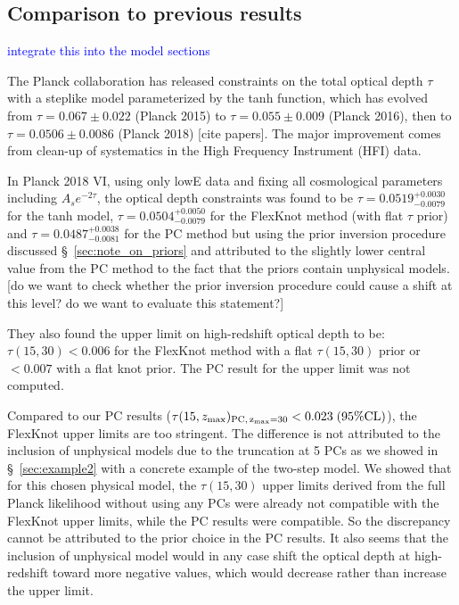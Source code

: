 \documentclass[prd,twocolumn,amsmath,amssymb,floatfix,superscriptaddress,nofootinbib]{revtex4-1}
\newcommand{\zmax}{z_{\rm max}}
\newcommand{\wh}[1]{\textcolor{blue}{#1}}
\begin{document}
{

\appendix



\subsection{Comparison to previous results}
\wh{integrate this into the model sections}

The Planck collaboration has released constraints on the total optical depth $\tau$ with a steplike model parameterized by the tanh function, which has evolved from $\tau = 0.067 \pm 0.022$ (Planck 2015) to $\tau = 0.055 \pm 0.009$ (Planck 2016), then to $\tau = 0.0506 \pm 0.0086$ (Planck 2018) [cite papers]. The major improvement comes from clean-up of systematics in the High Frequency Instrument (HFI) data. 

In Planck 2018 VI, using only lowE data and fixing all cosmological parameters including $A_s e^{-2\tau}$, the optical depth constraints was found to be $\tau = 0.0519^{+0.0030}_{-0.0079}$ for the tanh model, 
$\tau = 0.0504^{+0.0050}_{-0.0079}$ 
for the FlexKnot method (with flat $\tau$ prior) and 
$\tau = 0.0487^{+0.0038}_{-0.0081}$
for the PC method but using the prior inversion procedure
discussed \S~\ref{sec:note_on_priors} and attributed to the slightly lower central value from the PC method to the fact that the priors contain unphysical models. [do we want to check whether the prior inversion procedure could cause a shift at this level? do we want to evaluate this statement?]

They also found the upper limit on high-redshift optical depth to be: $\tau(15, 30) < 0.006$ for the FlexKnot method with a flat $\tau(15, 30)$ prior or $<0.007$ with a flat knot prior. The PC result for the upper limit was not computed. 

Compared to our PC results ($\tau(15, \zmax)_{\rm PC,\, \zmax=30} < 0.023 \; (95\% \mathrm{CL})$), the FlexKnot upper limits are too stringent. The difference is not attributed to the inclusion of unphysical models due to the truncation at 5 PCs as we showed in \S~\ref{sec:example2} with a concrete example of the two-step model. We showed that for this chosen physical model, the $\tau(15, 30)$ upper limits derived from the full Planck likelihood without using any PCs were already not compatible with the FlexKnot upper limits, while the PC results were compatible. So the discrepancy cannot be attributed to the prior choice in the PC results. It also seems that the inclusion of unphysical model would in any case shift the optical depth at high-redshift toward more negative values, which would decrease rather than increase the upper limit. 

}
\end{document}
